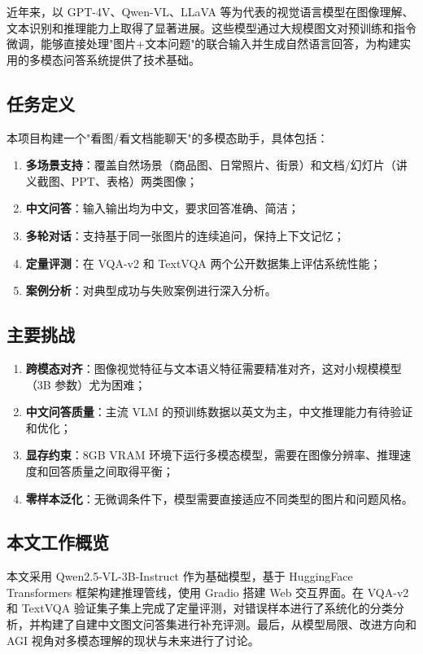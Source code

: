 \documentclass{SYSUReport}
\begin{document}
近年来，以 GPT-4V、Qwen-VL、LLaVA 等为代表的视觉语言模型在图像理解、文本识别和推理能力上取得了显著进展。这些模型通过大规模图文对预训练和指令微调，能够直接处理"图片+文本问题"的联合输入并生成自然语言回答，为构建实用的多模态问答系统提供了技术基础。

\subsection{任务定义}

本项目构建一个"看图/看文档能聊天"的多模态助手，具体包括：

\begin{enumerate}[label=(\arabic*)]
    \item \textbf{多场景支持}：覆盖自然场景（商品图、日常照片、街景）和文档/幻灯片（讲义截图、PPT、表格）两类图像；
    \item \textbf{中文问答}：输入输出均为中文，要求回答准确、简洁；
    \item \textbf{多轮对话}：支持基于同一张图片的连续追问，保持上下文记忆；
    \item \textbf{定量评测}：在 VQA-v2 和 TextVQA 两个公开数据集上评估系统性能；
    \item \textbf{案例分析}：对典型成功与失败案例进行深入分析。
\end{enumerate}

\subsection{主要挑战}

\begin{enumerate}[label=(\arabic*)]
    \item \textbf{跨模态对齐}：图像视觉特征与文本语义特征需要精准对齐，这对小规模模型（3B 参数）尤为困难；
    \item \textbf{中文问答质量}：主流 VLM 的预训练数据以英文为主，中文推理能力有待验证和优化；
    \item \textbf{显存约束}：8GB VRAM 环境下运行多模态模型，需要在图像分辨率、推理速度和回答质量之间取得平衡；
    \item \textbf{零样本泛化}：无微调条件下，模型需要直接适应不同类型的图片和问题风格。
\end{enumerate}

\subsection{本文工作概览}

本文采用 Qwen2.5-VL-3B-Instruct 作为基础模型，基于 HuggingFace Transformers 框架构建推理管线，使用 Gradio 搭建 Web 交互界面。在 VQA-v2 和 TextVQA 验证集子集上完成了定量评测，对错误样本进行了系统化的分类分析，并构建了自建中文图文问答集进行补充评测。最后，从模型局限、改进方向和 AGI 视角对多模态理解的现状与未来进行了讨论。
\end{document}
